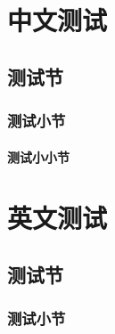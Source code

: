 \documentclass[codepkg = minted, titlestyle = lralign]{course-report}
\begin{document}
\maketitle

\frontmatter

\tableofcontents

\mainmatter

\chapter{中文测试}

\section{测试节}

\zhlipsum[1]

\subsection{测试小节}

{
  \bfseries
  \zhlipsum[1-4][name = nanshanjing]
}


\subsubsection{测试小小节}

{
  \itshape  
  \zhlipsum[1-3][name = xiangyu]
}



\chapter{英文测试}

\section{测试节}

\zhlipsum[1]
\begin{english}
  \lipsum[1]
\end{english}
\zhlipsum[1]


\subsection{测试小节}

\zhlipsum[1]

\begin{english}
  \itshape
  \lipsum[2-5]
\end{english}
\end{document}
